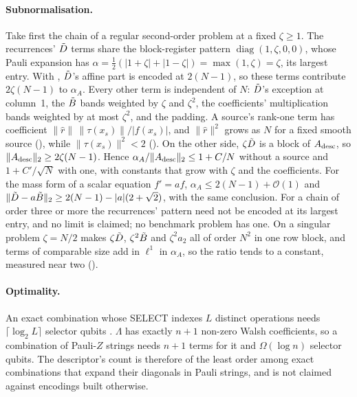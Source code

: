 \paragraph{Subnormalisation.} Take first the chain of a regular second-order problem at a fixed $\zeta\ge1$. The recurrences' $\tilde{D}$ terms share the block-register pattern $\operatorname{diag}(1,\zeta,0,0)$, whose Pauli expansion has $\alpha=\tfrac12(|1+\zeta|+|1-\zeta|)=\max(1,\zeta)=\zeta$, its largest entry. With , $\tilde{D}$'s affine part is encoded at $2(N-1)$, so these terms contribute $2\zeta(N-1)$ to $\alpha_A$. Every other term is independent of $N$: $\tilde{D}$'s exception at column~1, the $\tilde{B}$ bands weighted by $\zeta$ and $\zeta^2$, the coefficients' multiplication bands weighted by at most $\zeta^2$, and the padding. A source's rank-one term has coefficient $\|\hat r\|\,\|\tau(x_s)\|/|f(x_s)|$, and $\|\hat r\|^2$ grows as $N$ for a fixed smooth source (), while $\|\tau(x_s)\|^2<2$ (). On the other side, $\zeta\tilde{D}$ is a block of $A_{\mathrm{desc}}$, so $\|A_{\mathrm{desc}}\|_2\ge2\zeta(N-1)$. Hence $\alpha_A/\|A_{\mathrm{desc}}\|_2\le1+C/N$ without a source and $1+C'/\sqrt N$ with one, with constants that grow with $\zeta$ and the coefficients. For the mass form of a scalar equation $f'=af$, $\alpha_A\le2(N-1)+\mathcal{O}(1)$ and $\|\tilde{D}-a\tilde{B}\|_2\ge2(N-1)-|a|(2+\sqrt2)$, with the same conclusion. For a chain of order three or more the recurrences' pattern need not be encoded at its largest entry, and no limit is claimed; no benchmark problem has one. On a singular problem $\zeta=N/2$ makes $\zeta\tilde{D}$, $\zeta^2\tilde{B}$ and $\zeta^2a_2$ all of order $N^2$ in one row block, and terms of comparable size add in $\ell^1$ in $\alpha_A$, so the ratio tends to a constant, measured near two ().

\paragraph{Optimality.} An exact combination whose SELECT indexes $L$ distinct operations needs $\lceil\log_2L\rceil$ selector qubits \cite{chakraborty2025qsvt}. $\Lambda$ has exactly $n+1$ non-zero Walsh coefficients, so a combination of Pauli-$Z$ strings needs $n+1$ terms for it and $\Omega(\log n)$ selector qubits. The descriptor's count is therefore of the least order among exact combinations that expand their diagonals in Pauli strings, and is not claimed against encodings built otherwise.

